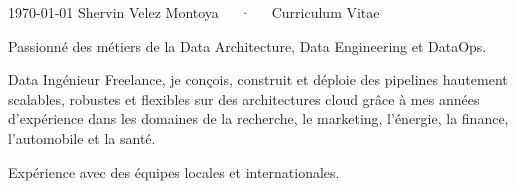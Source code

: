 \documentclass[11pt, a4paper]{awesome-cv}
\begin{document}
\makecvheader

\makecvfooter
{\today}
{Shervin Velez Montoya~~~·~~~Curriculum Vitae}
{}


\begin{cvparagraph}
	Passionné des métiers de la Data Architecture, Data Engineering et DataOps.

	Data Ingénieur Freelance, je conçois, construit et déploie des pipelines hautement scalables, robustes et flexibles sur des architectures cloud grâce à mes années d'expérience dans les domaines de la recherche,
	le marketing, l'énergie, la finance, l'automobile et la santé.

	Expérience avec des équipes locales et internationales.
\end{cvparagraph}





\end{document}
